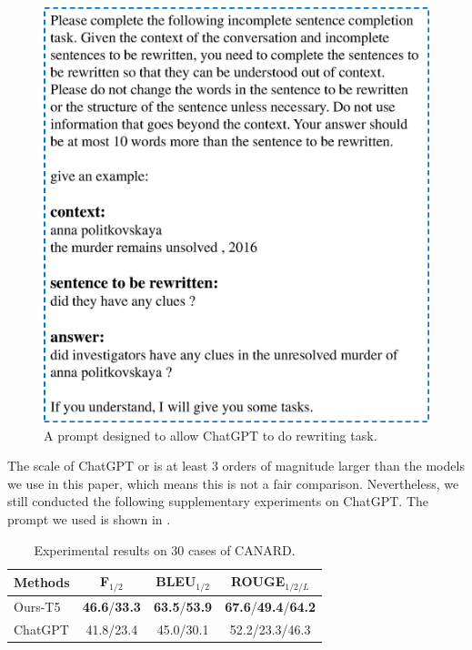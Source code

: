 \begin{figure}[th]
        \centering
        \includegraphics[width=1.0\columnwidth]{prompt.eps}
        \caption{A prompt designed to allow ChatGPT to do rewriting task.}
        \label{fig:prompt}
\end{figure}

The scale of ChatGPT or is at least 3 orders of magnitude larger than  the models we use in this paper, which means this is not a fair comparison. Nevertheless, we still conducted the following supplementary experiments on ChatGPT. The prompt we used is shown in .

\begin{table}[ht!]
\centering
\scriptsize
\begin{tabular}{l|ccc}
\toprule
\textbf{Methods}&    \textbf{F}$_{1/2}$ & \textbf{BLEU}$_{1/2}$ & \textbf{ROUGE}$_{1/2/L}$  \\ \midrule
Ours-T5 & \textbf{46.6}/\textbf{33.3} & \textbf{63.5}/\textbf{53.9}  & \textbf{67.6}/\textbf{49.4}/\textbf{64.2}  \\ \midrule
ChatGPT &41.8/23.4  & 45.0/30.1 & 52.2/23.3/46.3  \\
\bottomrule
\end{tabular}
\caption{Experimental results on 30 cases of CANARD.}
\label{tab:result-chatgpt}
\end{table}

